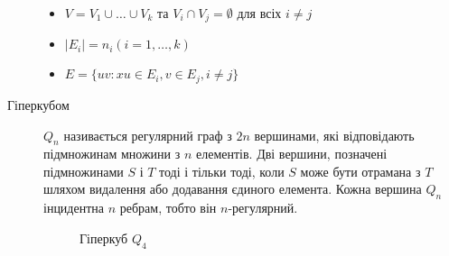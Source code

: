 \begin{description}
        \begin{itemize}     
        \item $V=V_1 \cup \dots \cup V_k$ та $V_i \cap V_j = \emptyset$ для всіх $i \ne j$
        \item $\vert E_i \vert = n_i (i=1,\dots,k)$
        \item $E = \lbrace uv : xu \in E_i, v \in E_j, i \ne j \rbrace$
        \end{itemize}
        \item[Гіперкубом] $Q_n$ називається регулярний граф з $2n$ вершинами, які відповідають підмножинам множини з $n$ елементів. Дві вершини, позначені підмножинами $S$ і $T$ тоді і тільки тоді, коли $S$ може бути отрамана з $T$ шляхом видалення або додавання єдиного елемента. Кожна вершина $Q_n$ інцидентна $n$ ребрам, тобто він $n$-регулярний.
          \begin{figure}[h]
            \centering
            
            \caption{Гіперкуб $Q_4$}
            \label{hypercube_4}
          \end{figure}
\end{description}

